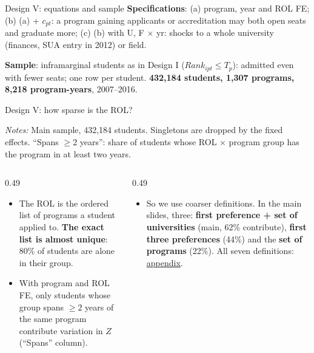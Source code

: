 \documentclass{beamer}
\begin{document}
\begin{frame}{Design V: equations and sample}
\vspace{0.05cm}
\scriptsize
\textbf{Specifications}: (a) program, year and ROL FE; (b) (a) + $c_{pt}$: a program gaining applicants or accreditation may both open seats and graduate more; (c) (b) with U, F $\times$ yr: shocks to a whole university (finances, SUA entry in 2012) or field.

\vspace{0.05cm}
\textbf{Sample}: inframarginal students as in Design I ($Rank_{ipt}\le T_p$): admitted even with fewer seats; one row per student. \textbf{432,184 students, 1,307 programs, 8,218 program-years}, 2007--2016.
\end{frame}

\begin{frame}{Design V: how sparse is the ROL?}
\centering
\tiny
\resizebox{0.88\textwidth}{!}{}

\vspace{0.05cm}
\parbox{0.97\textwidth}{\tiny \textit{Notes:} Main sample, 432,184 students. Singletons are dropped by the fixed effects. ``Spans $\geq$2 years'': share of students whose ROL $\times$ program group has the program in at least two years.}

\vspace{0.2cm}
\raggedright
\begin{columns}[T,onlytextwidth]
\begin{column}{0.49\textwidth}
\scriptsize
\begin{itemize}
    \setlength{\itemsep}{3pt}
    \item The ROL is the ordered list of programs a student applied to. \textbf{The exact list is almost unique}: 80\% of students are alone in their group.
    \item With program and ROL FE, only students whose group spans $\geq2$ years of the same program contribute variation in $Z$ (``Spans'' column).
\end{itemize}
\end{column}
\begin{column}{0.49\textwidth}
\scriptsize
\begin{itemize}
    \setlength{\itemsep}{3pt}
    \item So we use coarser definitions. In the main slides, three: \textbf{first preference + set of universities} (main, 62\% contribute), \textbf{first three preferences} (44\%) and the \textbf{set of programs} (22\%). All seven definitions: \hyperlink{d5-app-rol-ctrl}{\color{blue}appendix}.
\end{itemize}
\end{column}
\end{columns}
\end{frame}
\end{document}
